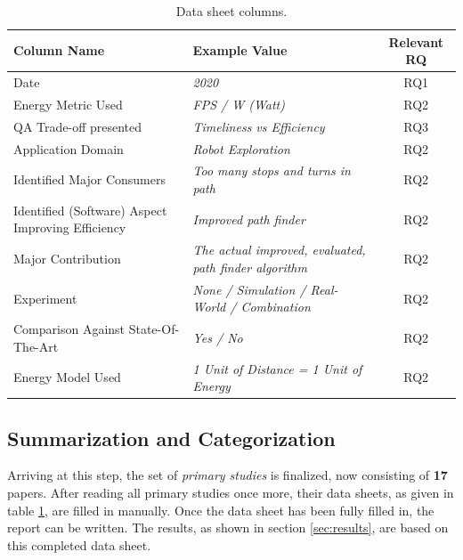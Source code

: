 \begin{table}[t]
    \centering
    \caption{Data sheet columns.}
    \begin{tabular}{llc}
        \toprule
            Column Name & 
            Example Value & 
            Relevant RQ  \\
        \midrule
            Date & 
                \textit{2020} & 
                RQ1 \\
            Energy Metric Used & 
                \textit{FPS / W (Watt)} & 
                RQ2 \\
            QA Trade-off presented & 
                \textit{Timeliness vs Efficiency} & 
                RQ3 \\
            Application Domain & 
                \textit{Robot Exploration} & 
                RQ2 \\
            Identified Major Consumers & 
                \textit{Too many stops and turns in path} & 
                RQ2 \\
            Identified (Software) Aspect Improving Efficiency & 
                \textit{Improved path finder} & 
                RQ2 \\
            Major Contribution & 
                \textit{The actual improved, evaluated, path finder algorithm} & 
                RQ2 \\
            Experiment & 
                \textit{None / Simulation / Real-World / Combination} & 
                RQ2 \\
            Comparison Against State-Of-The-Art & 
                \textit{Yes / No} & 
                RQ2 \\
            Energy Model Used &
                \textit{1 Unit of Distance = 1 Unit of Energy} & 
                RQ2 \\
        \bottomrule
    \end{tabular}
    \label{table:data_sheet}
\end{table}

\subsection{Summarization and Categorization}
\label{sec:study_design:summ_categor}

Arriving at this step, the set of \textit{primary studies} is finalized, now consisting of \textbf{17} papers.
After reading all primary studies once more, their data sheets, as given in table \ref{table:data_sheet}, are filled in manually. 
Once the data sheet has been fully filled in, the report can be written. 
The results, as shown in section \ref{sec:results}, are based on this completed data sheet.